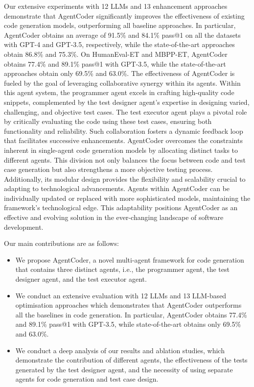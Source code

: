 \documentclass[manuscript,screen,review]{acmart}
\newcommand{\xxx}{AgentCoder\xspace}
\begin{document}
Our extensive experiments with 12 LLMs and 13 enhancement approaches demonstrate that \xxx significantly improves the effectiveness of existing code generation models, outperforming all baseline approaches. 
In particular, \xxx obtains an average of 91.5\% and 84.1\% pass@1 on all the datasets with GPT-4 and GPT-3.5, respectively, while the state-of-the-art approaches obtain 86.8\% and 75.3\%.
On HumanEval-ET and MBPP-ET, 
\xxx obtains 77.4\% and 89.1\% pass@1 with GPT-3.5, while the state-of-the-art approaches obtain only 69.5\% and 63.0\%. The effectiveness of \xxx is fueled by the goal of leveraging collaborative synergy within its agents. Within this agent system, the programmer agent excels in crafting high-quality code snippets, complemented by the test designer agent's expertise in designing varied, challenging, and objective test cases. The test executor agent plays a pivotal role by critically evaluating the code using these test cases, ensuring both functionality and reliability. Such collaboration fosters a dynamic feedback loop that facilitates successive enhancements. \xxx overcomes the constraints inherent in single-agent code generation models by allocating distinct tasks to different agents. This division not only balances the focus between code and test case generation but also strengthens a more objective testing process. Additionally, its modular design provides the flexibility and scalability crucial to adapting to technological advancements. Agents within \xxx can be individually updated or replaced with more sophisticated models, maintaining the framework's technological edge. This adaptability positions \xxx as an effective and evolving solution in the ever-changing landscape of software development.

Our main contributions are as follows:

\begin{itemize}
\item We propose \xxx, a novel multi-agent framework for code generation that contains three distinct agents, i.e., the programmer agent, the test designer agent, and the test executor agent.

\item We conduct an extensive evaluation with 12 LLMs and 13 LLM-based optimisation approaches which demonstrates that \xxx outperforms all the baselines in code generation. In particular, \xxx obtains 77.4\% and 89.1\% pass@1 with GPT-3.5, while state-of-the-art obtains only 69.5\% and 63.0\%. 

\item We conduct a deep analysis of our results and ablation studies, which demonstrate the contribution of different agents, the effectiveness of the tests generated by the test designer agent, and the necessity of using separate agents for code generation and test case design. 

\end{itemize}
\end{document}
